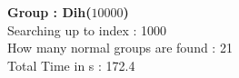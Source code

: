 \textbf{Group : Dih($10000$)}\\
Searching up to index : 1000\\
How many normal groups are found : 21\\
Total Time in s : 172.4\\
